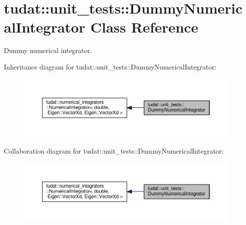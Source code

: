 \hypertarget{classtudat_1_1unit__tests_1_1DummyNumericalIntegrator}{}\section{tudat\+:\+:unit\+\_\+tests\+:\+:Dummy\+Numerical\+Integrator Class Reference}
\label{classtudat_1_1unit__tests_1_1DummyNumericalIntegrator}


Dummy numerical integrator.  




Inheritance diagram for tudat\+:\+:unit\+\_\+tests\+:\+:Dummy\+Numerical\+Integrator\+:
\nopagebreak
\begin{figure}[H]
\begin{center}
\leavevmode
\includegraphics[width=350pt]{classtudat_1_1unit__tests_1_1DummyNumericalIntegrator__inherit__graph}
\end{center}
\end{figure}


Collaboration diagram for tudat\+:\+:unit\+\_\+tests\+:\+:Dummy\+Numerical\+Integrator\+:
\nopagebreak
\begin{figure}[H]
\begin{center}
\leavevmode
\includegraphics[width=350pt]{classtudat_1_1unit__tests_1_1DummyNumericalIntegrator__coll__graph}
\end{center}
\end{figure}
